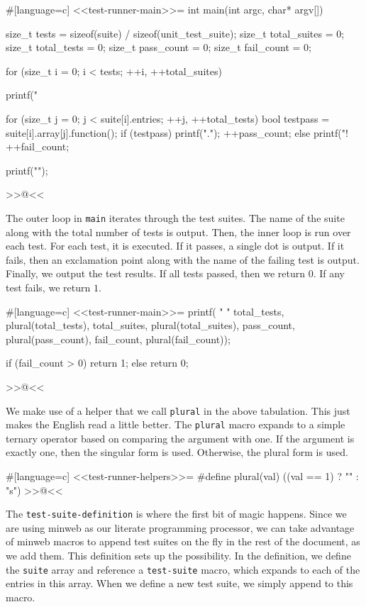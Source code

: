 #[language=c]
<<test-runner-main>>=
int main(int argc, char* argv[])
{
    size_t tests = sizeof(suite) / sizeof(unit_test_suite);
    size_t total_suites = 0;
    size_t total_tests = 0;
    size_t pass_count = 0;
    size_t fail_count = 0;

    for (size_t i = 0; i < tests; ++i, ++total_suites)
    {
        printf("%

        for (size_t j = 0; j < suite[i].entries; ++j, ++total_tests)
        {
            bool testpass = suite[i].array[j].function();
            if (testpass)
            {
                printf(".");
                ++pass_count;
            }
            else
            {
                printf("!%
                ++fail_count;
            }
        }

        printf("\n");
    }
>>@<<

The outer loop in \verb/main/ iterates through the test suites. The name of the
suite along with the total number of tests is output. Then, the inner loop is
run over each test. For each test, it is executed. If it passes, a single dot is
output. If it fails, then an exclamation point along with the name of the
failing test is output.  Finally, we output the test results.  If all tests
passed, then we return $0$. If any test fails, we return $1$.

#[language=c]
<<test-runner-main>>=
    printf(
        "\nRan %
        "%
        total_tests, plural(total_tests), total_suites, plural(total_suites),
        pass_count, plural(pass_count), fail_count, plural(fail_count));

    if (fail_count > 0)
        return 1;
    else
        return 0;
}
>>@<<

\newpage

We make use of a helper that we call \verb/plural/ in the above tabulation. This
just makes the English read a little better.  The \verb/plural/ macro expands to
a simple ternary operator based on comparing the argument with one. If the
argument is exactly one, then the singular form is used. Otherwise, the plural
form is used.

#[language=c]
<<test-runner-helpers>>=
#define plural(val) ((val == 1) ? "" : "s")
>>@<<

The \verb/test-suite-definition/ is where the first bit of magic happens. Since
we are using minweb as our literate programming processor, we can take advantage
of minweb macros to append test suites on the fly in the rest of the document,
as we add them.  This definition sets up the possibility.  In the definition, we
define the \verb/suite/ array and reference a \verb/test-suite/ macro, which
expands to each of the entries in this array.  When we define a new test suite,
we simply append to this macro.

